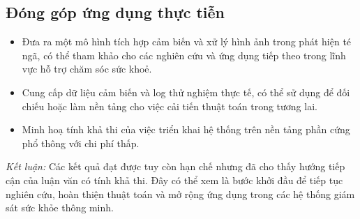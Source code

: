 \subsection*{Đóng góp ứng dụng thực tiễn}
\begin{itemize}
    \item Đưa ra một mô hình tích hợp cảm biến và xử lý hình ảnh trong phát hiện té ngã, có thể tham khảo cho các nghiên cứu và ứng dụng tiếp theo trong lĩnh vực hỗ trợ chăm sóc sức khoẻ.
    \item Cung cấp dữ liệu cảm biến và log thử nghiệm thực tế, có thể sử dụng để đối chiếu hoặc làm nền tảng cho việc cải tiến thuật toán trong tương lai.
    \item Minh hoạ tính khả thi của việc triển khai hệ thống trên nền tảng phần cứng phổ thông với chi phí thấp.
\end{itemize}

\textit{Kết luận:} Các kết quả đạt được tuy còn hạn chế nhưng đã cho thấy hướng tiếp cận của luận văn có tính khả thi. Đây có thể xem là bước khởi đầu để tiếp tục nghiên cứu, hoàn thiện thuật toán và mở rộng ứng dụng trong các hệ thống giám sát sức khỏe thông minh.
